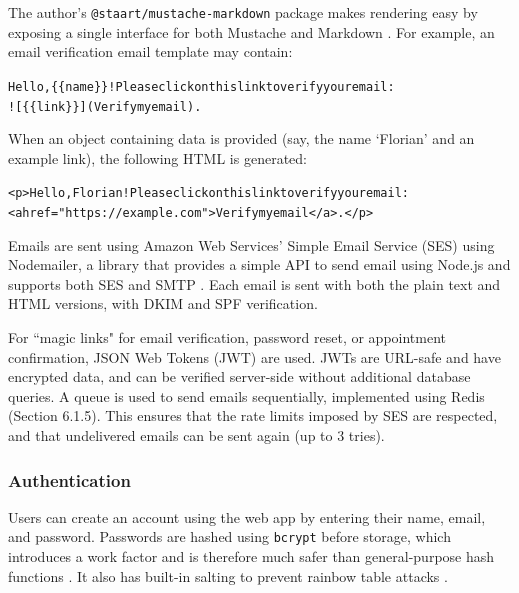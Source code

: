\documentclass{article}
\begin{document}
The author's \texttt{@staart/mustache-markdown} package makes rendering easy by exposing a single interface for both Mustache and Markdown \cite{noauthor_staart/mustache-markdown_nodate}. For example, an email verification email template may contain:

\begin{alltt}
Hello, \textcolor{variable}{\{\{name\}\}}! Please click on this link to verify your email:
![\textcolor{variable}{\{\{link\}\}}](Verify my email).
\end{alltt}

When an object containing data is provided (say, the name `Florian' and an example link), the following HTML is generated:

\begin{alltt}
\textcolor{variable}{<p>}Hello, Florian! Please click on this link to verify your email:
\textcolor{variable}{<a href=}\textcolor{string}{"https://example.com"}\textcolor{variable}{>}Verify my email\textcolor{variable}{</a>}.\textcolor{variable}{</p>}
\end{alltt}

Emails are sent using Amazon Web Services' Simple Email Service (SES) using Nodemailer, a library that provides a simple API to send email using Node.js and supports both SES and SMTP \cite{noauthor_nodemailer_nodate}. Each email is sent with both the plain text and HTML versions, with DKIM and SPF verification.

For ``magic links" for email verification, password reset, or appointment confirmation, JSON Web Tokens (JWT) are used. JWTs are URL-safe and have encrypted data, and can be verified server-side without additional database queries. A queue is used to send emails sequentially, implemented using Redis (Section 6.1.5). This ensures that the rate limits imposed by SES are respected, and that undelivered emails can be sent again (up to 3 tries).

\subsubsection{Authentication}

Users can create an account using the web app by entering their name, email, and password. Passwords are hashed using \texttt{bcrypt} before storage, which introduces a work factor and is therefore much safer than general-purpose hash functions \cite{provos_future-adaptive_1999}. It also has built-in salting to prevent rainbow table attacks \cite{noauthor_how_2010}.
\end{document}
